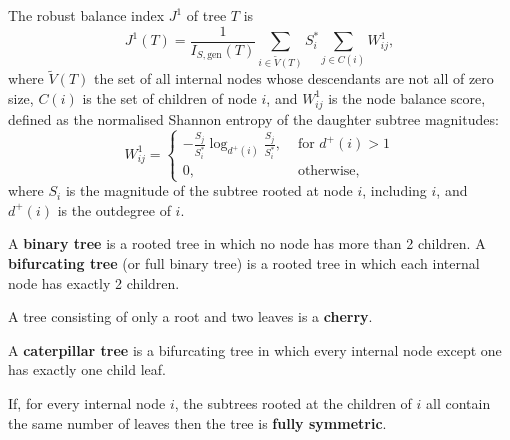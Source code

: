 \begin{definition}\label{j1defn}
    The robust balance index $J^1$ of tree $T$ is
    \begin{equation}\label{J1def}
        J^1(T) = \frac{1}{I_{S,\text{gen}}(T)} \sum_{i\in\tilde{V}(T)} S_i^{*}
        \sum_{j\in C(i)}W_{ij}^{1},
    \end{equation}
    where $\tilde{V}(T)$ the set of all internal nodes whose descendants are not
    all of zero size, $C(i)$ is the set of children of node $i$, and $W_{ij}^1$
    is the node balance score, defined as the normalised Shannon entropy of the
    daughter subtree magnitudes:
    \begin{equation}\label{Wij1}
        W_{ij}^1 =
        \begin{cases}
            -\frac{S_j}{S_i^*}\log_{d^+(i)}\frac{S_j}{S_i^*},& \text{ for } d^+(i) > 1\\
            0, & \text{ otherwise,}
        \end{cases}
    \end{equation}
    where $S_i$ is the magnitude of the subtree rooted at node $i$, including
    $i$, and $d^+(i)$ is the outdegree of $i$.
\end{definition}

\begin{definition}
    A \textbf{binary tree} is a rooted tree in which no node has more than 2
    children. A \textbf{bifurcating tree} (or full binary tree) is a rooted tree
    in which each internal node has exactly 2 children.
\end{definition}

\begin{definition}[Cherry]
    A tree consisting of only a root and two leaves is a \textbf{cherry}.
\end{definition}

\begin{definition}
    A \textbf{caterpillar tree} is a bifurcating tree in which every internal
    node except one has exactly one child leaf.
\end{definition}

\begin{definition}
    If, for every internal node $i$, the subtrees rooted at the children of $i$
    all contain the same number of leaves then the tree is \textbf{fully symmetric}.
\end{definition}

